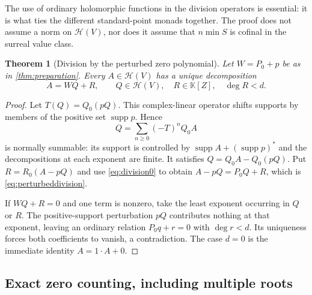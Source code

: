 \documentclass[11pt,letterpaper]{article}
\numberwithin{equation}{section}
\newtheorem{theorem}{Theorem}[section]
\theoremstyle{definition}
\theoremstyle{remark}
\newcommand{\K}{\mathbb K}
\newcommand{\HH}{\mathscr H}
\DeclareMathOperator{\supp}{supp}
\begin{document}
The use of ordinary holomorphic functions in the division operators is
essential: it is what ties the different standard-point monads together.
The proof does not assume a norm on $\HH(V)$, nor does it assume that
$n\min S$ is cofinal in the surreal value class.

\begin{theorem}[Division by the perturbed zero polynomial]\label{thm:division}
Let $W=P_0+p$ be as in \cref{thm:preparation}. Every $A\in\HH(V)$ has
a unique decomposition
\begin{equation}\label{eq:perturbeddivision}
 A=WQ+R,\qquad Q\in\HH(V),\quad R\in\K[Z],\quad\deg R<d.
\end{equation}
\end{theorem}
\begin{proof}
Let $T(Q)=Q_0(pQ)$. This complex-linear operator shifts supports by
members of the positive set $\supp p$. Hence
\[
 Q=\sum_{n\ge0}(-T)^nQ_0A
\]
is normally summable: its support is controlled by
$\supp A+(\supp p)^*$ and the decompositions at each exponent are
finite. It satisfies $Q=Q_0A-Q_0(pQ)$. Put
$R=R_0(A-pQ)$ and use \eqref{eq:division0} to obtain
$A-pQ=P_0Q+R$, which is \eqref{eq:perturbeddivision}.

If $WQ+R=0$ and one term is nonzero, take the least exponent occurring
in $Q$ or $R$. The positive-support perturbation $pQ$ contributes
nothing at that exponent, leaving an ordinary relation
$P_0q+r=0$ with $\deg r<d$. Its uniqueness forces both coefficients to
vanish, a contradiction. The case $d=0$ is the immediate identity
$A=1\cdot A+0$.
\end{proof}

\subsection{Exact zero counting, including multiple roots}
\end{document}
